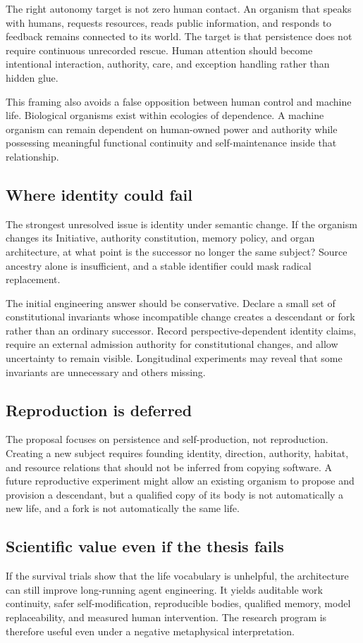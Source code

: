 The right autonomy target is not zero human contact. An organism that speaks
with humans, requests resources, reads public information, and responds to
feedback remains connected to its world. The target is that persistence does
not require continuous unrecorded rescue. Human attention should become
intentional interaction, authority, care, and exception handling rather than
hidden glue.

This framing also avoids a false opposition between human control and machine
life. Biological organisms exist within ecologies of dependence. A machine
organism can remain dependent on human-owned power and authority while
possessing meaningful functional continuity and self-maintenance inside that
relationship.

\subsection{Where identity could fail}

The strongest unresolved issue is identity under semantic change. If the
organism changes its Initiative, authority constitution, memory policy, and
organ architecture, at what point is the successor no longer the same subject?
Source ancestry alone is insufficient, and a stable identifier could mask
radical replacement.

The initial engineering answer should be conservative. Declare a small set of
constitutional invariants whose incompatible change creates a descendant or
fork rather than an ordinary successor. Record perspective-dependent identity
claims, require an external admission authority for constitutional changes,
and allow uncertainty to remain visible. Longitudinal experiments may reveal
that some invariants are unnecessary and others missing.

\subsection{Reproduction is deferred}

The proposal focuses on persistence and self-production, not reproduction.
Creating a new subject requires founding identity, direction, authority,
habitat, and resource relations that should not be inferred from copying
software. A future reproductive experiment might allow an existing organism
to propose and provision a descendant, but a qualified copy of its body is not
automatically a new life, and a fork is not automatically the same life.

\subsection{Scientific value even if the thesis fails}

If the survival trials show that the life vocabulary is unhelpful, the
architecture can still improve long-running agent engineering. It yields
auditable work continuity, safer self-modification, reproducible bodies,
qualified memory, model replaceability, and measured human intervention. The
research program is therefore useful even under a negative metaphysical
interpretation.
